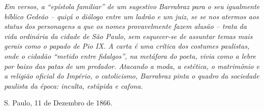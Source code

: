 \begin{didascalia}
\emph{Em versos, a ``epístola familiar'' de um sugestivo Barrabraz para o
seu igualmente bíblico Gedeão -- quiçá o diálogo entre um ladrão e um
juiz, se se nos atermos aos status dos personagens a que os nomes
provavelmente fazem alusão -- trata da vida ordinária da cidade de São
Paulo, sem esquecer-se de assuntar temas mais gerais como o papado de
Pio IX. A carta é uma crítica dos costumes paulistas, onde o cidadão
``metido entre fidalgos'', na metáfora do poeta, vivia como a lebre por
baixo das patas de um predador. Atacando a moda, a estética, o
matrimônio e a religião oficial do Império, o catolicismo, Barrabraz
pinta o quadro da sociedade paulista da época: inculta, estúpida e
cafona.}
\end{didascalia}

\asterisc{}

\hfill S. Paulo, 11 de Dezembro de 1866.


